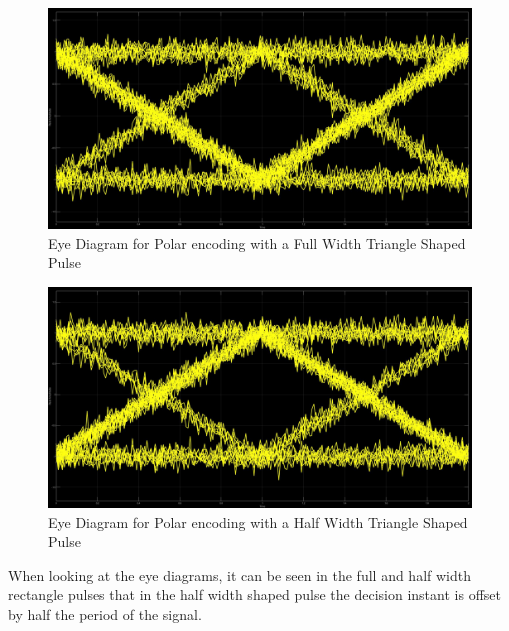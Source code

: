 \documentclass{article}
\begin{document}
\begin{figure}[H]
  \includegraphics[width = \linewidth]{Polar_Tri_F_Eye.jpg}
  \caption{Eye Diagram for Polar encoding with a Full Width Triangle Shaped Pulse}
  \label{fig:Polar-Tri-F-Eye}
\end{figure}
\begin{figure}[H]
  \includegraphics[width = \linewidth]{Polar_Tri_H_Eye.jpg}
  \caption{Eye Diagram for Polar encoding with a Half Width Triangle Shaped Pulse}
  \label{fig:Polar-Tri-H-Eye}
\end{figure}
When looking at the eye diagrams, it can be seen in the full and half width rectangle pulses that in the half width shaped pulse the decision instant is offset by half the period of the signal.
\end{document}
